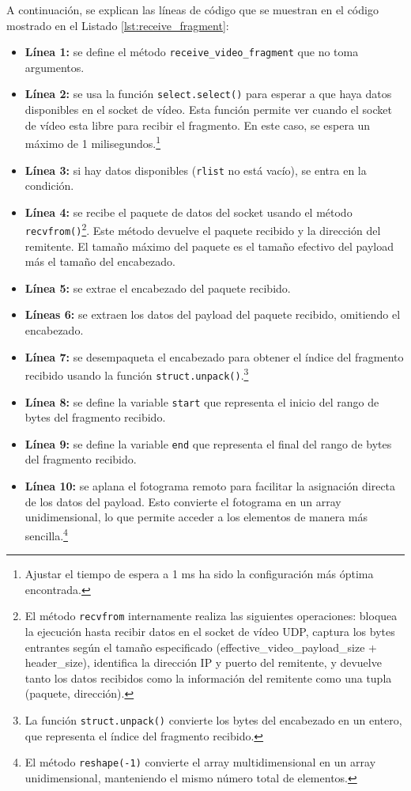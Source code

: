 A continuación, se explican las líneas de código que se muestran en el código mostrado en el Listado \ref{lst:receive_fragment}:
\begin{itemize}
    \item \textbf{Línea 1:} se define el método \texttt{receive\_video\_fragment} que no toma argumentos.
    \item \textbf{Línea 2:} se usa la función \texttt{select.select()} para esperar a que haya datos disponibles en el socket de vídeo. Esta función permite ver cuando el socket de vídeo esta libre para recibir el fragmento. En este caso, se espera un máximo de 1 milisegundos.\footnote{Ajustar el tiempo de espera a 1 ms ha sido la configuración más óptima encontrada.}
    \item \textbf{Línea 3:} si hay datos disponibles (\texttt{rlist} no está vacío), se entra en la condición.
    \item \textbf{Línea 4:} se recibe el paquete de datos del socket usando el método \texttt{recvfrom()}\footnote{El método \texttt{recvfrom} internamente realiza las siguientes operaciones: bloquea la ejecución hasta recibir datos en el socket de vídeo UDP, captura los bytes entrantes según el tamaño especificado (effective\_video\_payload\_size + header\_size), identifica la dirección IP y puerto del remitente, y devuelve tanto los datos recibidos como la información del remitente como una tupla (paquete, dirección).}. Este método devuelve el paquete recibido y la dirección del remitente. El tamaño máximo del paquete es el tamaño efectivo del payload más el tamaño del encabezado.
    \item \textbf{Línea 5:} se extrae el encabezado del paquete recibido.
    \item \textbf{Líneas 6:} se extraen los datos del payload del paquete recibido, omitiendo el encabezado.
    \item \textbf{Línea 7:} se desempaqueta el encabezado para obtener el índice del fragmento recibido usando la función \texttt{struct.unpack()}.\footnote{La función \texttt{struct.unpack()} convierte los bytes del encabezado en un entero, que representa el índice del fragmento recibido.}
    \item \textbf{Línea 8:} se define la variable \texttt{start} que representa el inicio del rango de bytes del fragmento recibido.
    \item \textbf{Línea 9:} se define la variable \texttt{end} que representa el final del rango de bytes del fragmento recibido.
    \item \textbf{Línea 10:} se aplana el fotograma remoto para facilitar la asignación directa de los datos del payload. Esto convierte el fotograma en un array unidimensional, lo que permite acceder a los elementos de manera más sencilla.\footnote{El método \texttt{reshape(-1)} convierte el array multidimensional en un array unidimensional, manteniendo el mismo número total de elementos.}

\end{itemize}
